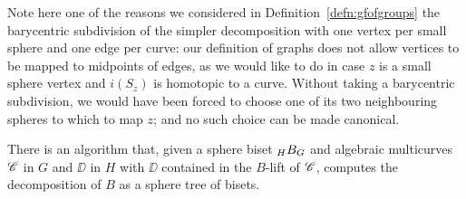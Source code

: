 \documentclass{amsart}
\begin{document}
Note here one of the reasons we considered in
Definition~\ref{defn:gfofgroups} the barycentric subdivision of the
simpler decomposition with one vertex per small sphere and one edge
per curve: our definition of graphs does not allow vertices to be
mapped to midpoints of edges, as we would like to do in case $z$ is a
small sphere vertex and $i(S_z)$ is homotopic to a curve. Without
taking a barycentric subdivision, we would have been forced to choose
one of its two neighbouring spheres to which to map $z$; and no such
choice can be made canonical.

\begin{thm}\label{thm:DecompOfBiset}
  There is an algorithm that, given a sphere biset $\subscript H B_G$ and
  algebraic multicurves ${\mathscr C}$ in $G$ and $\DD$ in $H$ with $\DD$
  contained in the $B$-lift of ${\mathscr C}$, computes the decomposition of
  $B$ as a sphere tree of bisets.
\end{thm}
\end{document}
